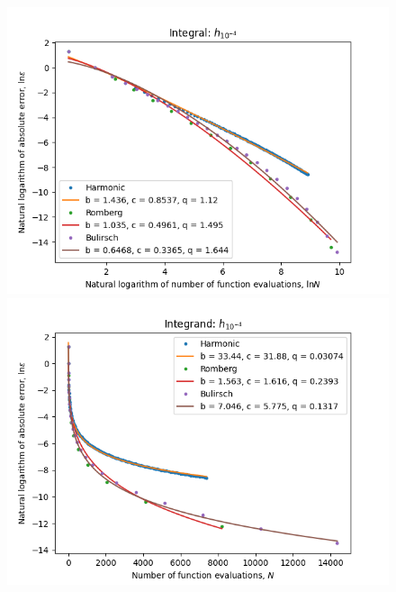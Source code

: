 \begin{figure}[H]
\centering
\begin{minipage}{0.45\textwidth}
\centering
\includegraphics[scale=0.45]{romberg_plots/h_tenthousandth_hp_log_log_pow_fit_trend.png}
\end{minipage}
\begin{minipage}{0.45\textwidth}
\centering
\includegraphics[scale=0.45]{romberg_plots/h_tenthousandth_hp_trend.png}
\end{minipage}
\end{figure}

